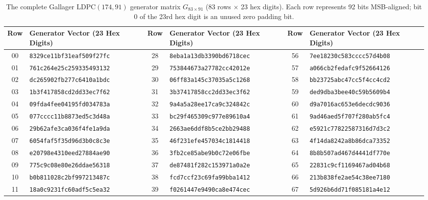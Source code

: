 \begin{table}[t]
\centering
\small
\vspace{-4pt}
\setlength{\tabcolsep}{6pt}
\renewcommand{\arraystretch}{0.95}
\caption{The complete Gallager $\text{LDPC}(174, 91)$ generator matrix $G_{83 \times 91}$ (83 rows $\times$ 23 hex digits). Each row represents 92 bits MSB-aligned; bit 0 of the 23rd hex digit is an unused zero padding bit.}
\label{tab:ldpc_g}
\vspace{-2pt}
\begin{tabular}{@{}cl | cl | cl@{}}
\toprule
\textbf{Row} & \textbf{Generator Vector (23 Hex Digits)} & \textbf{Row} & \textbf{Generator Vector (23 Hex Digits)} & \textbf{Row} & \textbf{Generator Vector (23 Hex Digits)} \\
\midrule
00 & \texttt{8329ce11bf31eaf509f27fc} & 28 & \texttt{8eba1a13db3390bd6718cec} & 56 & \texttt{7ee18230c583cccc57d4b08} \\
01 & \texttt{761c264e25c259335493132} & 29 & \texttt{753844673a27782cc42012e} & 57 & \texttt{a066cb2fedafc9f52664126} \\
02 & \texttt{dc265902fb277c6410a1bdc} & 30 & \texttt{06ff83a145c37035a5c1268} & 58 & \texttt{bb23725abc47cc5f4cc4cd2} \\
03 & \texttt{1b3f417858cd2dd33ec7f62} & 31 & \texttt{3b37417858cc2dd33ec3f62} & 59 & \texttt{ded9dba3bee40c59b5609b4} \\
04 & \texttt{09fda4fee04195fd034783a} & 32 & \texttt{9a4a5a28ee17ca9c324842c} & 60 & \texttt{d9a7016ac653e6decdc9036} \\
05 & \texttt{077cccc11b8873ed5c3d48a} & 33 & \texttt{bc29f465309c977e89610a4} & 61 & \texttt{9ad46aed5f707f280ab5fc4} \\
06 & \texttt{29b62afe3ca036f4fe1a9da} & 34 & \texttt{2663ae6ddf8b5ce2bb29488} & 62 & \texttt{e5921c77822587316d7d3c2} \\
07 & \texttt{6054faf5f35d96d3b0c8c3e} & 35 & \texttt{46f231efe457034c1814418} & 63 & \texttt{4f14da8242a8b86dca73352} \\
08 & \texttt{e20798e4310eed27884ae90} & 36 & \texttt{3fb2ce85abe9b0c72e06fbe} & 64 & \texttt{8b8b507ad467d4441df770e} \\
09 & \texttt{775c9c08e80e26ddae56318} & 37 & \texttt{de87481f282c153971a0a2e} & 65 & \texttt{22831c9cf1169467ad04b68} \\
10 & \texttt{b0b811028c2bf997213487c} & 38 & \texttt{fcd7ccf23c69fa99bba1412} & 66 & \texttt{213b838fe2ae54c38ee7180} \\
11 & \texttt{18a0c9231fc60adf5c5ea32} & 39 & \texttt{f0261447e9490ca8e474cec} & 67 & \texttt{5d926b6dd71f085181a4e12} \\

\end{tabular}
\end{table}
